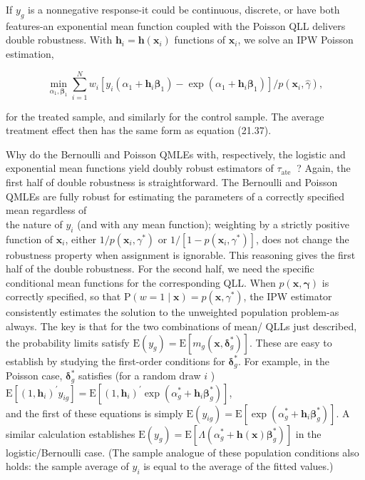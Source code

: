\documentclass[10pt]{article}
\begin{document}
If $y_{g}$ is a nonnegative response-it could be continuous, discrete, or have both features-an exponential mean function coupled with the Poisson QLL delivers double robustness. With $\mathbf{h}_{i}=\mathbf{h}\left(\mathbf{x}_{i}\right)$ functions of $\mathbf{x}_{i}$, we solve an IPW Poisson estimation,

$$
\min _{\alpha_{1}, \boldsymbol{\beta}_{1}} \sum_{i=1}^{N} w_{i}\left[y_{i}\left(\alpha_{1}+\mathbf{h}_{i} \boldsymbol{\beta}_{1}\right)-\exp \left(\alpha_{1}+\mathbf{h}_{i} \boldsymbol{\beta}_{1}\right)\right] / p\left(\mathbf{x}_{i}, \hat{\gamma}\right),
$$

for the treated sample, and similarly for the control sample. The average treatment effect then has the same form as equation (21.37).

Why do the Bernoulli and Poisson QMLEs with, respectively, the logistic and exponential mean functions yield doubly robust estimators of $\tau_{\text {ate }}$ ? Again, the first half of double robustness is straightforward. The Bernoulli and Poisson QMLEs are fully robust for estimating the parameters of a correctly specified mean regardless of\\
the nature of $y_{i}$ (and with any mean function); weighting by a strictly positive function of $\mathbf{x}_{i}$, either $1 / p\left(\mathbf{x}_{i}, \gamma^{*}\right)$ or $1 /\left[1-p\left(\mathbf{x}_{i}, \gamma^{*}\right)\right]$, does not change the robustness property when assignment is ignorable. This reasoning gives the first half of the double robustness. For the second half, we need the specific conditional mean functions for the corresponding QLL. When $p(\mathbf{x}, \boldsymbol{\gamma})$ is correctly specified, so that $\mathrm{P}(w=1 \mid \mathbf{x})= p\left(\mathbf{x}, \gamma^{*}\right)$, the IPW estimator consistently estimates the solution to the unweighted population problem-as always. The key is that for the two combinations of mean/ QLLs just described, the probability limits satisfy $\mathrm{E}\left(y_{g}\right)=\mathrm{E}\left[m_{g}\left(\mathbf{x}, \boldsymbol{\delta}_{g}^{*}\right)\right]$. These are easy to establish by studying the first-order conditions for $\boldsymbol{\delta}_{g}^{*}$. For example, in the Poisson case, $\boldsymbol{\delta}_{g}^{*}$ satisfies (for a random draw $i$ )\\
$\mathrm{E}\left[\left(1, \mathbf{h}_{i}\right)^{\prime} y_{i g}\right]=\mathrm{E}\left[\left(1, \mathbf{h}_{i}\right)^{\prime} \exp \left(\alpha_{g}^{*}+\mathbf{h}_{i} \boldsymbol{\beta}_{g}^{*}\right)\right]$,\\
and the first of these equations is simply $\mathrm{E}\left(y_{i g}\right)=\mathrm{E}\left[\exp \left(\alpha_{g}^{*}+\mathbf{h}_{i} \boldsymbol{\beta}_{g}^{*}\right)\right]$. A similar calculation establishes $\mathrm{E}\left(y_{g}\right)=\mathrm{E}\left[\Lambda\left(\alpha_{g}^{*}+\mathbf{h}(\mathbf{x}) \boldsymbol{\beta}_{g}^{*}\right)\right]$ in the logistic/Bernoulli case. (The sample analogue of these population conditions also holds: the sample average of $y_{i}$ is equal to the average of the fitted values.)
\end{document}
